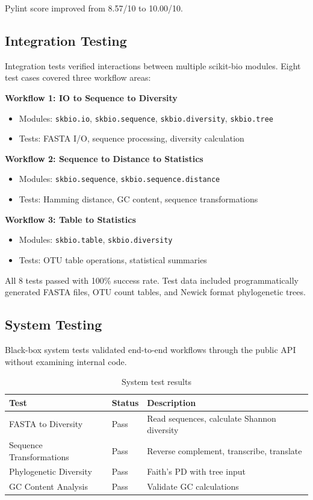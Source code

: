 \documentclass[11pt]{article}
\begin{document}
Pylint score improved from 8.57/10 to 10.00/10.

\subsection{Integration Testing}

Integration tests verified interactions between multiple scikit-bio modules. Eight test cases covered three workflow areas:

\textbf{Workflow 1: IO to Sequence to Diversity}
\begin{itemize}[noitemsep]
    \item Modules: \texttt{skbio.io}, \texttt{skbio.sequence}, \texttt{skbio.diversity}, \texttt{skbio.tree}
    \item Tests: FASTA I/O, sequence processing, diversity calculation
\end{itemize}

\textbf{Workflow 2: Sequence to Distance to Statistics}
\begin{itemize}[noitemsep]
    \item Modules: \texttt{skbio.sequence}, \texttt{skbio.sequence.distance}
    \item Tests: Hamming distance, GC content, sequence transformations
\end{itemize}

\textbf{Workflow 3: Table to Statistics}
\begin{itemize}[noitemsep]
    \item Modules: \texttt{skbio.table}, \texttt{skbio.diversity}
    \item Tests: OTU table operations, statistical summaries
\end{itemize}

All 8 tests passed with 100\% success rate. Test data included programmatically generated FASTA files, OTU count tables, and Newick format phylogenetic trees.

\subsection{System Testing}

Black-box system tests validated end-to-end workflows through the public API without examining internal code.

\begin{table}[h]
\centering
\small
\begin{tabular}{llp{5cm}}
\toprule
\textbf{Test} & \textbf{Status} & \textbf{Description} \\
\midrule
FASTA to Diversity & Pass & Read sequences, calculate Shannon diversity \\
Sequence Transformations & Pass & Reverse complement, transcribe, translate \\
Phylogenetic Diversity & Pass & Faith's PD with tree input \\
GC Content Analysis & Pass & Validate GC calculations \\
\bottomrule
\end{tabular}
\caption{System test results}
\end{table}
\end{document}
